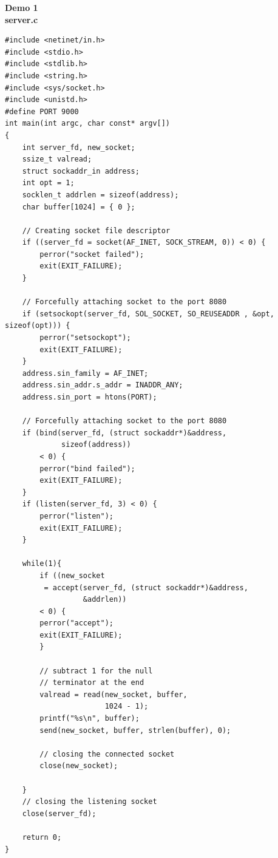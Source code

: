 \documentclass[a4paper,12pt]{article}
\begin{document}
\noindent
\noindent
\textbf{Demo 1}\\
\textbf{server.c}
\begin{lstlisting}
#include <netinet/in.h>
#include <stdio.h>
#include <stdlib.h>
#include <string.h>
#include <sys/socket.h>
#include <unistd.h>
#define PORT 9000
int main(int argc, char const* argv[])
{
    int server_fd, new_socket;
    ssize_t valread;
    struct sockaddr_in address;
    int opt = 1;
    socklen_t addrlen = sizeof(address);
    char buffer[1024] = { 0 };

    // Creating socket file descriptor
    if ((server_fd = socket(AF_INET, SOCK_STREAM, 0)) < 0) {
        perror("socket failed");
        exit(EXIT_FAILURE);
    }

    // Forcefully attaching socket to the port 8080 
    if (setsockopt(server_fd, SOL_SOCKET, SO_REUSEADDR , &opt, sizeof(opt))) {
        perror("setsockopt");
        exit(EXIT_FAILURE);
    }
    address.sin_family = AF_INET;
    address.sin_addr.s_addr = INADDR_ANY;
    address.sin_port = htons(PORT);

    // Forcefully attaching socket to the port 8080
    if (bind(server_fd, (struct sockaddr*)&address,
             sizeof(address))
        < 0) {
        perror("bind failed");
        exit(EXIT_FAILURE);
    }
    if (listen(server_fd, 3) < 0) {
        perror("listen");
        exit(EXIT_FAILURE);
    }

    while(1){
        if ((new_socket
         = accept(server_fd, (struct sockaddr*)&address,
                  &addrlen))
        < 0) {
        perror("accept");
        exit(EXIT_FAILURE);
        }
      
        // subtract 1 for the null
        // terminator at the end
        valread = read(new_socket, buffer,
                       1024 - 1); 
        printf("%s\n", buffer);
        send(new_socket, buffer, strlen(buffer), 0);

        // closing the connected socket
        close(new_socket);     

    }
    // closing the listening socket
    close(server_fd);
    
    return 0;
}
\end{lstlisting}
\end{document}
